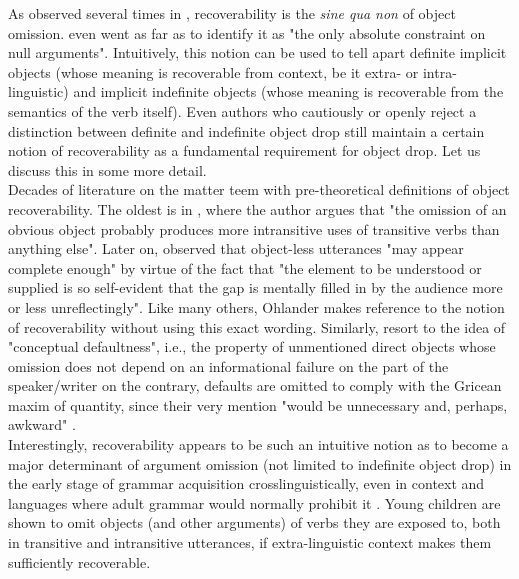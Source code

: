 As observed several times in , recoverability is the \textit{sine qua non} of object omission. \textcite{Cote1996} even went as far as to identify it as "the only absolute constraint on null arguments". Intuitively, this notion can be used to tell apart definite implicit objects (whose meaning is recoverable from context, be it extra- or intra-linguistic) and implicit indefinite objects (whose meaning is recoverable from the semantics of the verb itself). Even authors who cautiously \parencite{Resnik1993, Resnik1996, OlsenResnik1997} or openly \parencite{Glass2013, Glass2020, glass2022english} reject a distinction between definite and indefinite object drop still maintain a certain notion of recoverability as a fundamental requirement for object drop. Let us discuss this in some more detail.\\
Decades of literature on the matter teem with pre-theoretical definitions of object recoverability. The oldest is in \textcite[321]{Jespersen1927}, where the author argues that "the omission of an obvious object probably produces more intransitive uses of transitive verbs than anything else". Later on, \textcite[105]{Ohlander1943} observed that object-less utterances "may appear complete enough" by virtue of the fact that "the element to be understood or supplied is so self-evident that the gap is mentally filled in by the audience more or less unreflectingly". Like many others, Ohlander makes reference to the notion of recoverability without using this exact wording. Similarly, \textcite{HickmanEtAl2016} resort to the idea of "conceptual defaultness", i.e., the property of unmentioned direct objects whose omission does not depend on an informational failure on the part of the speaker/writer \textemdash on the contrary, defaults are omitted to comply with the Gricean maxim of quantity, since their very mention "would be unnecessary and, perhaps, awkward" \parencite[516]{HickmanEtAl2016}.\\
Interestingly, recoverability appears to be such an intuitive notion as to become a major determinant of argument omission (not limited to indefinite object drop) in the early stage of grammar acquisition crosslinguistically, even in context and languages where adult grammar would normally prohibit it \parencite{allen2000discourse, RatitamkulEtAl2004, Medina2007, sopata2016null, Rasetti2003, PerezLerouxEtAl2011, PerezLerouxEtAl2013, Perez-LerouxEtAl2018, OGradyEtAl2008, Ingham1993}. Young children are shown to omit objects (and other arguments) of verbs they are exposed to, both in transitive and intransitive utterances, if extra-linguistic context makes them sufficiently recoverable.


